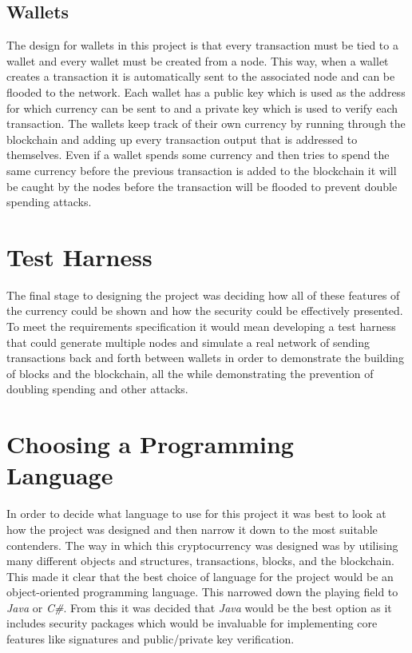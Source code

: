 \documentclass{l4proj}
\begin{document}
\subsection{Wallets}
The design for wallets in this project is that every transaction must be tied to a wallet and every wallet
must be created from a node. This way, when a wallet creates a transaction it is automatically sent to the
associated node and can be flooded to the network. Each wallet has a public key which is used as the address
for which currency can be sent to and a private key which is used to verify each transaction. The wallets 
keep track of their own currency by running through the blockchain and adding up every transaction output
that is addressed to themselves. Even if a wallet spends some currency and then tries to spend the same
currency before the previous transaction is added to the blockchain it will be caught by the nodes before the
transaction will be flooded to prevent double spending attacks.

\section{Test Harness}
The final stage to designing the project was deciding how all of these features of the currency could be shown
and how the security could be effectively presented. To meet the requirements specification it would mean developing
a test harness that could generate multiple nodes and simulate a real network of sending transactions back and 
forth between wallets in order to demonstrate the building of blocks and the blockchain, all the while demonstrating
the prevention of doubling spending and other attacks.

\section{Choosing a Programming Language}
In order to decide what language to use for this project it was best to look at how the project was designed
and then narrow it down to the most suitable contenders. The way in which this cryptocurrency was designed was 
by utilising many different objects and structures, transactions, blocks, and the blockchain. This made it clear that 
the best choice of language for the project would be an object-oriented programming language. This narrowed down
the playing field to \textit{Java} or \textit{C\#}. From this it was decided that \textit{Java} would be the best 
option as it includes security packages which would be invaluable for implementing core features like signatures and 
public/private key verification.
\end{document}
